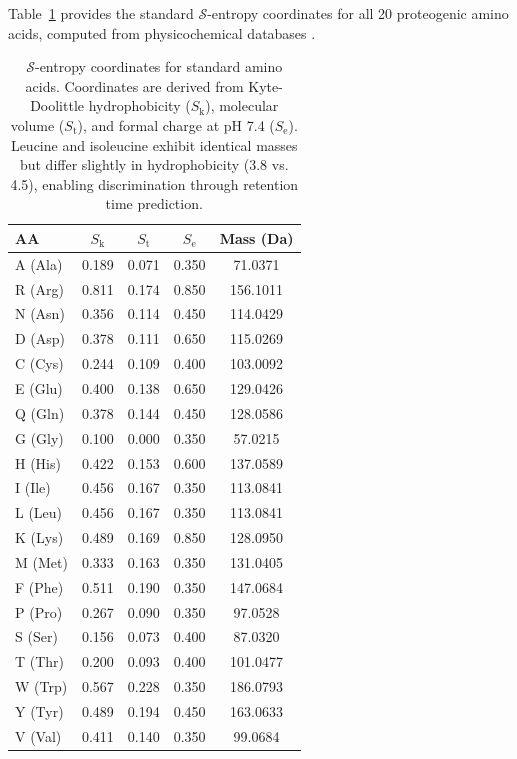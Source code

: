 \documentclass[11pt,twocolumn]{article}
\newcommand{\sentropy}{$\mathcal{S}$-entropy}
\newcommand{\Sk}{S_{\text{k}}}
\newcommand{\St}{S_{\text{t}}}
\newcommand{\Se}{S_{\text{e}}}
\begin{document}
Table~\ref{tab:sentropy_coords} provides the standard \sentropy{} coordinates for all 20 proteogenic amino acids, computed from physicochemical databases \cite{kyte1982simple, zamyatnin1972protein}.

\begin{table}[h]
\centering
\caption{\sentropy{} coordinates for standard amino acids. Coordinates are derived from Kyte-Doolittle hydrophobicity ($\Sk$), molecular volume ($\St$), and formal charge at pH 7.4 ($\Se$). Leucine and isoleucine exhibit identical masses but differ slightly in hydrophobicity (3.8 vs. 4.5), enabling discrimination through retention time prediction.}
\label{tab:sentropy_coords}
\begin{tabular}{@{}lcccc@{}}
\toprule
AA & $\Sk$ & $\St$ & $\Se$ & Mass (Da) \\
\midrule
A (Ala) & 0.189 & 0.071 & 0.350 & 71.0371 \\
R (Arg) & 0.811 & 0.174 & 0.850 & 156.1011 \\
N (Asn) & 0.356 & 0.114 & 0.450 & 114.0429 \\
D (Asp) & 0.378 & 0.111 & 0.650 & 115.0269 \\
C (Cys) & 0.244 & 0.109 & 0.400 & 103.0092 \\
E (Glu) & 0.400 & 0.138 & 0.650 & 129.0426 \\
Q (Gln) & 0.378 & 0.144 & 0.450 & 128.0586 \\
G (Gly) & 0.100 & 0.000 & 0.350 & 57.0215 \\
H (His) & 0.422 & 0.153 & 0.600 & 137.0589 \\
I (Ile) & 0.456 & 0.167 & 0.350 & 113.0841 \\
L (Leu) & 0.456 & 0.167 & 0.350 & 113.0841 \\
K (Lys) & 0.489 & 0.169 & 0.850 & 128.0950 \\
M (Met) & 0.333 & 0.163 & 0.350 & 131.0405 \\
F (Phe) & 0.511 & 0.190 & 0.350 & 147.0684 \\
P (Pro) & 0.267 & 0.090 & 0.350 & 97.0528 \\
S (Ser) & 0.156 & 0.073 & 0.400 & 87.0320 \\
T (Thr) & 0.200 & 0.093 & 0.400 & 101.0477 \\
W (Trp) & 0.567 & 0.228 & 0.350 & 186.0793 \\
Y (Tyr) & 0.489 & 0.194 & 0.450 & 163.0633 \\
V (Val) & 0.411 & 0.140 & 0.350 & 99.0684 \\
\bottomrule
\end{tabular}
\end{table}
\end{document}
